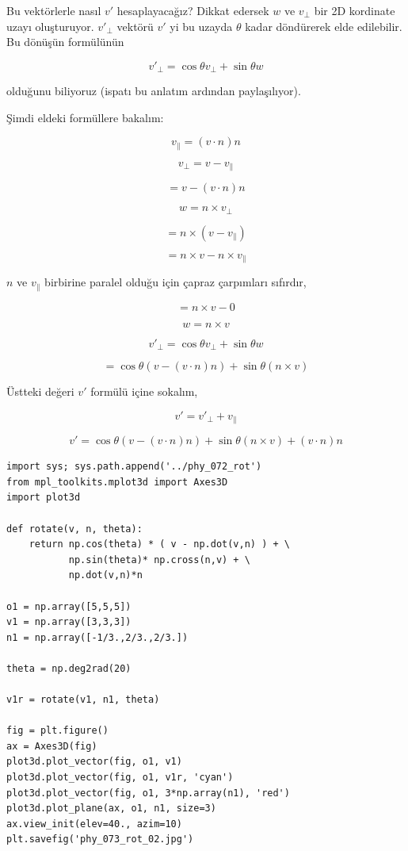 \documentclass[12pt,fleqn]{article}\usepackage{../../common}
\begin{document}
Bu vektörlerle nasıl $v'$ hesaplayacağız? Dikkat edersek $w$ ve $v_\perp$ bir 2D
kordinate uzayı oluşturuyor. $v'_\perp$ vektörü $v'$ yi bu uzayda $\theta$ kadar
döndürerek elde edilebilir. Bu dönüşün formülünün

$$
v'_\perp = \cos \theta v_\perp + \sin \theta w
$$

olduğunu biliyoruz (ispatı bu anlatım ardından paylaşılıyor).

Şimdi eldeki formüllere bakalım:

$$
v_\parallel = (v \cdot n) n
$$

$$
v_\perp = v - v_\parallel
$$

$$
= v - (v \cdot n) n
$$

$$
w = n \times v_\perp
$$

$$
= n \times (v - v_\parallel)
$$

$$
= n \times v - n \times v_\parallel
$$

$n$ ve $v_\parallel$ birbirine paralel olduğu için çapraz çarpımları sıfırdır,

$$
= n \times v - 0 
$$

$$
w = n \times v
$$

$$
v'_\perp = \cos \theta v_\perp + \sin \theta w
$$

$$
= \cos \theta (v - (v \cdot n) n) + \sin \theta (n \times v)
$$

Üstteki değeri $v'$ formülü içine sokalım,

$$
v' = v'_\perp + v_\parallel
$$

$$
v' = \cos \theta (v - (v \cdot n) n) + \sin \theta (n \times v) + (v \cdot n) n
$$

\begin{verbatim}
import sys; sys.path.append('../phy_072_rot')
from mpl_toolkits.mplot3d import Axes3D
import plot3d

def rotate(v, n, theta):
    return np.cos(theta) * ( v - np.dot(v,n) ) + \
           np.sin(theta)* np.cross(n,v) + \
           np.dot(v,n)*n
 
o1 = np.array([5,5,5])
v1 = np.array([3,3,3])
n1 = np.array([-1/3.,2/3.,2/3.])

theta = np.deg2rad(20)

v1r = rotate(v1, n1, theta)

fig = plt.figure()
ax = Axes3D(fig)
plot3d.plot_vector(fig, o1, v1)
plot3d.plot_vector(fig, o1, v1r, 'cyan')
plot3d.plot_vector(fig, o1, 3*np.array(n1), 'red')
plot3d.plot_plane(ax, o1, n1, size=3)
ax.view_init(elev=40., azim=10)
plt.savefig('phy_073_rot_02.jpg')
\end{verbatim}
\end{document}

